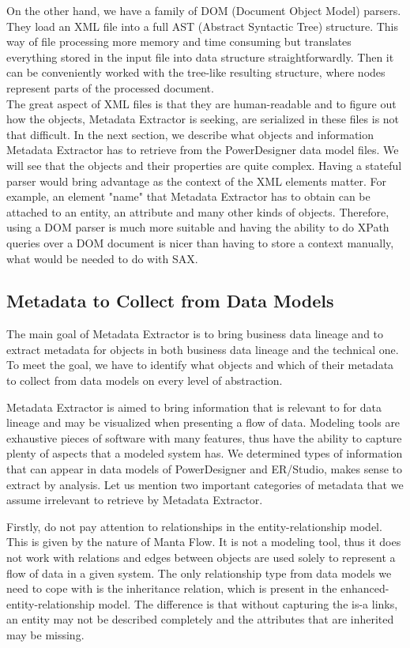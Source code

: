 On the other hand, we have a family of DOM (Document Object Model) parsers. 
They load an XML file into a full AST (Abstract Syntactic Tree) structure. 
This way of file processing more memory and time consuming but translates everything stored in the input file into data structure straightforwardly. 
Then it can be conveniently worked with the tree-like resulting structure, where nodes represent parts of the processed document. \\

The great aspect of XML files is that they are human-readable and to figure out how the objects, Metadata Extractor is seeking, are serialized in these files is not that difficult.
In the next section, we describe what objects and information Metadata Extractor has to retrieve from the PowerDesigner data model files. We will see that the objects and their properties are quite complex.
Having a stateful parser would bring advantage as the context of the XML elements matter. For example, an element "name" that Metadata Extractor has to obtain can be attached to an entity, an attribute and many other kinds of objects.
Therefore, using a DOM parser is much more suitable and having the ability to do XPath queries over a DOM document is nicer than having to store a context manually, what would be needed to do with SAX.

\subsection{Metadata to Collect from Data Models}
\label{metadata_enumeration}

The main goal of Metadata Extractor is to bring business data lineage and to extract metadata for objects in both business data lineage and the technical one.
To meet the goal, we have to identify what objects and which of their metadata to collect from data models on every level of abstraction.

Metadata Extractor is aimed to bring information that is relevant to for data lineage and may be visualized when presenting a flow of data.
Modeling tools are exhaustive pieces of software with many features, thus have the ability to capture plenty of aspects that a modeled system has.
We determined types of information that can appear in data models of PowerDesigner and ER/Studio, makes sense to extract by analysis. Let us mention two important categories of metadata that we assume irrelevant to retrieve by Metadata Extractor.

Firstly, do not pay attention to relationships in the entity-relationship model. 
This is given by the nature of Manta Flow. It is not a modeling tool, thus it does not work with relations and edges between objects are used solely to represent a flow of data in a given system.
The only relationship type from data models we need to cope with is the inheritance relation, which is present in the enhanced-entity-relationship model. 
The difference is that without capturing the is-a links, an entity may not be described completely and the attributes that are inherited may be missing.

